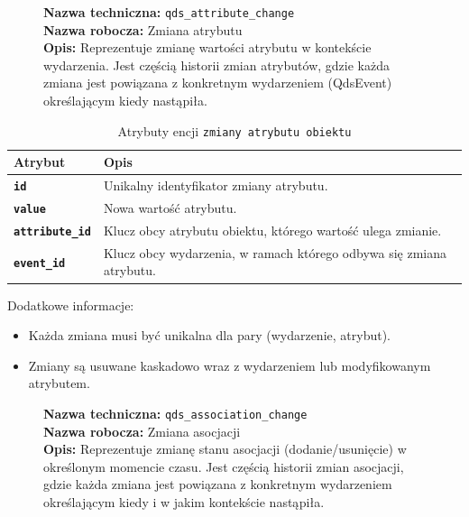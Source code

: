 \begin{figure}[H]
    \centering
    \begin{minipage}{0.8\textwidth}
        \begin{framed}
            \noindent\textbf{\large Nazwa techniczna:} \texttt{qds\_attribute\_change} \\
            \textbf{\large Nazwa robocza:} Zmiana atrybutu \\
            \textbf{\large Opis:} Reprezentuje zmianę wartości atrybutu w kontekście wydarzenia.
            Jest częścią historii zmian atrybutów, gdzie każda zmiana jest powiązana
            z konkretnym wydarzeniem (QdsEvent) określającym kiedy nastąpiła.
        \end{framed}
    \end{minipage}
\end{figure}

\begin{table}[H]
    \centering
    \renewcommand{\arraystretch}{1.6}
    \begin{tabular}{|>{\bfseries}l|p{}|}
        \hline
        \rowcolor[HTML]{EFEFEF} \textbf{Atrybut} & \textbf{Opis} \\
        \hline
        \texttt{id} & Unikalny identyfikator zmiany atrybutu. \\
        \hline
        \texttt{value} & Nowa wartość atrybutu. \\
        \hline
        \texttt{attribute\_id} & Klucz obcy atrybutu obiektu, którego wartość ulega zmianie. \\
        \hline
        \texttt{event\_id} & Klucz obcy wydarzenia, w ramach którego odbywa się zmiana atrybutu. \\
        \hline
    \end{tabular}
    \caption{Atrybuty encji \texttt{zmiany atrybutu obiektu}}
\end{table}

Dodatkowe informacje:
\begin{itemize}
    \item Każda zmiana musi być unikalna dla pary (wydarzenie, atrybut).
    \item Zmiany są usuwane kaskadowo wraz z wydarzeniem lub modyfikowanym atrybutem.
\end{itemize}

\begin{figure}[H]
    \centering
    \begin{minipage}{0.8\textwidth}
        \begin{framed}
            \noindent\textbf{\large Nazwa techniczna:} \texttt{qds\_association\_change} \\
            \textbf{\large Nazwa robocza:} Zmiana asocjacji \\
            \textbf{\large Opis:} Reprezentuje zmianę stanu asocjacji (dodanie/usunięcie) w określonym momencie czasu.
            Jest częścią historii zmian asocjacji, gdzie każda zmiana jest powiązana z konkretnym
            wydarzeniem określającym kiedy i w jakim kontekście nastąpiła.
        \end{framed}
    \end{minipage}
\end{figure}


